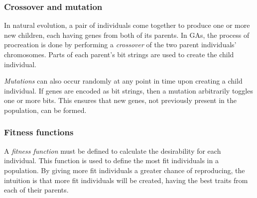 
\subsubsection{Crossover and mutation}
In natural evolution, a pair of individuals come together to produce one or more new children, each having genes from both of its parents. In GAs, the process of procreation is done by performing a \emph{crossover} of the two parent individuals' chromosomes. Parts of each parent's bit strings are used to create the child individual.

\emph{Mutations} can also occur randomly at any point in time upon creating a child individual. If genes are encoded as bit strings, then a mutation arbitrarily toggles one or more bits. This ensures that new genes, not previously present in the population, can be formed.

\subsubsection{Fitness functions}
A \emph{fitness function} must be defined to calculate the desirability for each individual. This function is used to define the most fit individuals in a population. By giving more fit individuals a greater chance of reproducing, the intuition is that more fit individuals will be created, having the best traits from each of their parents.

